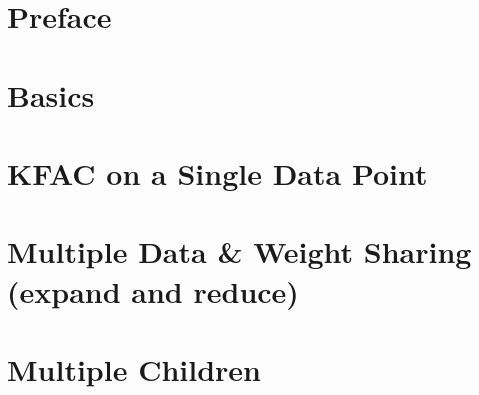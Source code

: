 \documentclass{article}
\begin{document}
\onecolumn


\clearpage

\tableofcontents
\clearpage

\section{Preface}

\clearpage


\section{Basics}


\section{KFAC on a Single Data Point}

\section{Multiple Data \& Weight Sharing (expand and reduce)}

\section{Multiple Children}

\clearpage


\appendix
\end{document}
